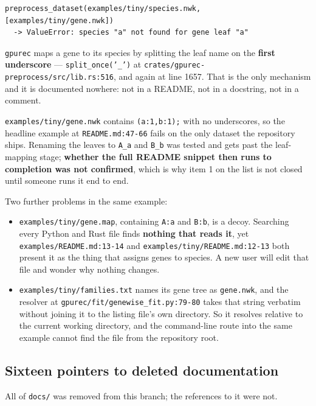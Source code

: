 \documentclass[11pt]{article}
\newcommand{\loc}[1]{\nolinkurl{#1}}
\newcommand{\dir}[1]{\nolinkurl{#1}}
\begin{document}
\begin{lstlisting}
preprocess_dataset(examples/tiny/species.nwk, [examples/tiny/gene.nwk])
  -> ValueError: species "a" not found for gene leaf "a"
\end{lstlisting}

\texttt{gpurec} maps a gene to its species by splitting the leaf name on the
\textbf{first underscore} --- \texttt{split\_once('\_')} at
\loc{crates/gpurec-preprocess/src/lib.rs:516}, and again at line 1657.  That is
the only mechanism and it is documented nowhere: not in a README, not in a
docstring, not in a comment.

\dir{examples/tiny/gene.nwk} contains \texttt{(a:1,b:1);} with no underscores,
so the headline example at \loc{README.md:47-66} fails on the only dataset the
repository ships.  Renaming the leaves to \texttt{A\_a} and \texttt{B\_b} was
tested and gets past the leaf-mapping stage; \textbf{whether the full README
snippet then runs to completion was not confirmed}, which is why item 1 on the
list is not closed until someone runs it end to end.

Two further problems in the same example:

\begin{itemize}
  \item \dir{examples/tiny/gene.map}, containing \texttt{A:a} and \texttt{B:b},
        is a decoy.  Searching every Python and Rust file finds \textbf{nothing
        that reads it}, yet \loc{examples/README.md:13-14} and
        \loc{examples/tiny/README.md:12-13} both present it as the thing that
        assigns genes to species.  A new user will edit that file and wonder why
        nothing changes.
  \item \dir{examples/tiny/families.txt} names its gene tree as
        \texttt{gene.nwk}, and the resolver at
        \loc{gpurec/fit/genewise\_fit.py:79-80} takes that string verbatim
        without joining it to the listing file's own directory.  So it resolves
        relative to the current working directory, and the command-line route
        into the same example cannot find the file from the repository root.
\end{itemize}

\subsection{Sixteen pointers to deleted documentation}

All of \dir{docs/} was removed from this branch; the references to it were not.
\end{document}
